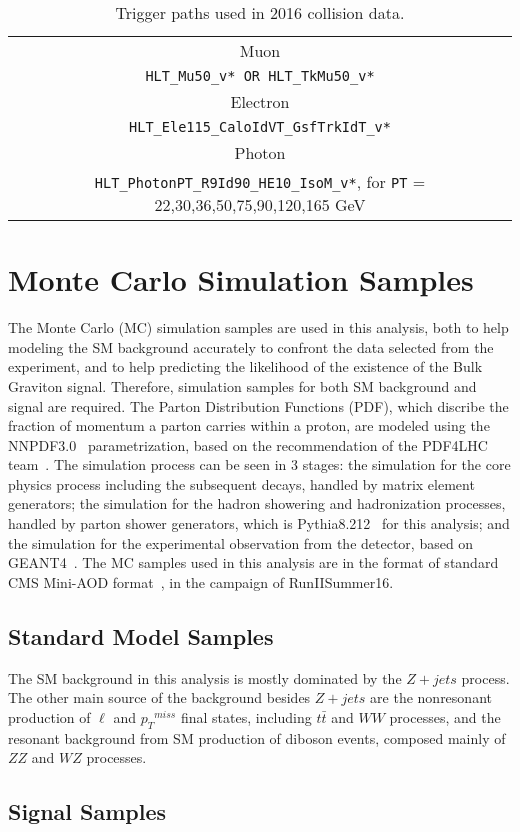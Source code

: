 \begin{table}[htbp!]
   \caption{Trigger paths used in 2016 collision data.
   \label{tab:triggerPaths}}
   \centering
   \begin{tabular}{ c }
\hline\hline
Muon  \\ \texttt{HLT\_Mu50\_v* OR HLT\_TkMu50\_v*}  \\ \hline
Electron \\ \texttt{HLT\_Ele115\_CaloIdVT\_GsfTrkIdT\_v*} \\ \hline
Photon \\ \texttt{HLT\_PhotonPT\_R9Id90\_HE10\_IsoM\_v*},  for \texttt{PT} = 22,30,36,50,75,90,120,165 GeV \\  
\hline
\hline
    \end{tabular}
\end{table}

\section{Monte Carlo Simulation Samples}
The Monte Carlo (MC) simulation samples are used in this analysis, both to help modeling the SM background accurately to confront the data selected from the experiment, and to help predicting the likelihood of the existence of the Bulk Graviton signal. Therefore, simulation samples for both SM background and signal are required. The Parton Distribution Functions (PDF), which discribe the fraction of momentum a parton carries within a proton, are modeled using the NNPDF3.0~\cite{sample_nnpdf30} parametrization, based on the recommendation of the PDF4LHC team~\cite{sample_pdf4lhc}. The simulation process can be seen in 3 stages: the simulation for the core physics process including the subsequent decays, handled by matrix element generators; the simulation for the hadron showering and hadronization processes, handled by parton shower generators, which is Pythia8.212~\cite{sample_pythia} for this analysis; and the simulation for the experimental observation from the detector, based on GEANT4~\cite{sample_geant4}. The MC samples used in this analysis are in the format of standard CMS Mini-AOD format~\cite{sample_miniaod}, in the campaign of RunIISummer16.

\subsection{Standard Model Samples}
The SM background in this analysis is mostly dominated by the $Z+jets$ process. The other main source of the background besides $Z+jets$ are the nonresonant production of $\ell$ and ${p_{T}}^{miss}$ final states, including $t\bar{t}$ and $WW$ processes, and the resonant background from SM production of diboson events, composed mainly of $ZZ$ and $WZ$ processes. 
\subsection{Signal Samples}




